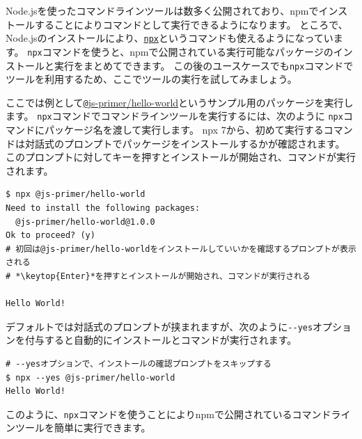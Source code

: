 Node.jsを使ったコマンドラインツールは数多く公開されており、npmでインストールすることによりコマンドとして実行できるようになります。
ところで、Node.jsのインストールにより、\href{https://docs.npmjs.com/cli/v8/commands/npx/}{\texttt{npx}}というコマンドも使えるようになっています。
\texttt{npx}コマンドを使うと、npmで公開されている実行可能なパッケージのインストールと実行をまとめてできます。
この後のユースケースでも\texttt{npx}コマンドでツールを利用するため、ここでツールの実行を試してみましょう。

ここでは例として\href{https://github.com/js-primer/hello-world}{\texttt @js-primer/hello-world}というサンプル用のパッケージを実行します。
\texttt{npx}コマンドでコマンドラインツールを実行するには、次のように
\texttt{npx}コマンドにパッケージ名を渡して実行します。
npx 7から、初めて実行するコマンドは対話式のプロンプトでパッケージをインストールするかが確認されます。
このプロンプトに対してキーを押すとインストールが開始され、コマンドが実行されます。

\begin{lstlisting}[escapechar=\*]
$ npx @js-primer/hello-world
Need to install the following packages:
  @js-primer/hello-world@1.0.0
Ok to proceed? (y)
# 初回は@js-primer/hello-worldをインストールしていいかを確認するプロンプトが表示される
# *\keytop{Enter}*を押すとインストールが開始され、コマンドが実行される

Hello World!
\end{lstlisting}

デフォルトでは対話式のプロンプトが挟まれますが、次のように\texttt{-\/-yes}オプションを付与すると自動的にインストールとコマンドが実行されます。

\begin{lstlisting}
# --yesオプションで、インストールの確認プロンプトをスキップする
$ npx --yes @js-primer/hello-world
Hello World!
\end{lstlisting}

このように、\texttt{npx}コマンドを使うことによりnpmで公開されているコマンドラインツールを簡単に実行できます。

